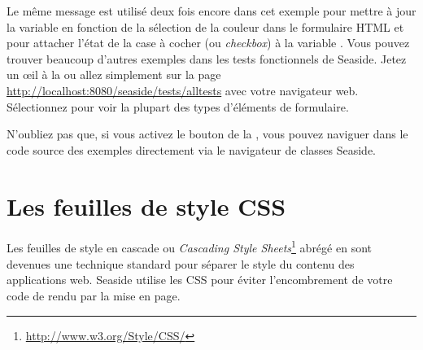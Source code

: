 \documentclass[a4paper,10pt,twoside]{book}
\begin{document}
Le même message est utilisé deux fois encore dans cet exemple pour
mettre à jour la variable  en fonction de la sélection de la
couleur dans le formulaire HTML et pour attacher l'état de la case à
cocher (ou \emph{checkbox}) à la variable .
Vous pouvez trouver beaucoup d'autres exemples dans les tests
fonctionnels de Seaside.
Jetez un \oe il à la  %
ou allez simplement sur la page
\url{http://localhost:8080/seaside/tests/alltests} avec votre
navigateur web.
Sélectionnez  
 pour voir la plupart des types d'éléments de formulaire.

N'oubliez pas que, si vous activez le bouton  de
la \toolbar, vous pouvez naviguer dans le code source des exemples
directement via le navigateur de classes Seaside. 

\section{Les feuilles de style CSS}


Les feuilles de style en cascade ou 
\emph{Cascading Style
  Sheets}\footnote{\url{http://www.w3.org/Style/CSS/}} abrégé en
  sont devenues une technique standard pour séparer le style
 du contenu des applications web.
Seaside utilise les CSS pour éviter l'encombrement de votre code de
rendu par la mise en page.
\end{document}
